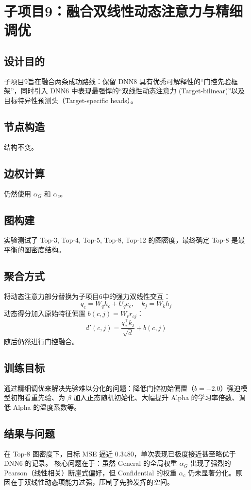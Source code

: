 \documentclass[UTF8]{ctexart}
\begin{document}
\section{子项目9：融合双线性动态注意力与精细调优}

\subsection{设计目的}
子项目9旨在融合两条成功路线：保留 DNN8 具有优秀可解释性的“门控先验框架”，同时引入 DNN6 中表现最强悍的“双线性动态注意力 (Target-bilinear)”以及目标特异性预测头（Target-specific heads）。

\subsection{节点构造}
结构不变。

\subsection{边权计算}
仍然使用 $\alpha_G$ 和 $\alpha_c$。

\subsection{图构建}
实验测试了 Top-3, Top-4, Top-5, Top-8, Top-12 的图密度，最终确定 Top-8 是最平衡的图密度结构。

\subsection{聚合方式}
将动态注意力部分替换为子项目6中的强力双线性交互：
\[
q_c = W_q h_c + U_q e_c, \quad k_j = W_k h_j
\]
动态得分加入原始特征偏置 $b(c,j) = W_r r_{cj}$：
\[
d'(c,j) = \frac{q_c^\top k_j}{\sqrt{d}} + b(c,j)
\]
随后仍然进行门控融合。

\subsection{训练目标}
通过精细调优来解决先验难以分化的问题：降低门控初始偏置（$b=-2.0$）强迫模型初期看重先验、为 $\beta$ 加入正态随机初始化、大幅提升 Alpha 的学习率倍数、调低 Alpha 的温度系数等。

\subsection{结果与问题}
在 Top-8 图密度下，目标 MSE 逼近 0.3480，单次表现已极度接近甚至略优于 DNN6 的记录。
核心问题在于：虽然 General 的全局权重 $\alpha_G$ 出现了强烈的 Pearson（线性相关）断崖式偏好，但 Confidential 的权重 $\alpha_c$ 仍未显著分化。原因在于双线性动态项能力过强，压制了先验发挥的空间。
\end{document}
